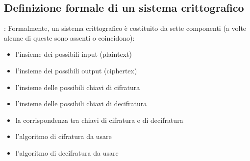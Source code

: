 \subsection{Definizione formale di un sistema crittografico}: Formalmente, un sistema crittografico è costituito da sette componenti (a volte alcune di queste sono assenti o coincidono):
\begin{itemize} 
  \item l'insieme dei possibili input (plaintext)
  \item l'insieme dei possibili output (ciphertex)
  \item l'insieme delle possibili chiavi di cifratura
  \item l'insieme delle possibili chiavi di decifratura
  \item la corrispondenza tra chiavi di cifratura e di decifratura
  \item l'algoritmo di cifratura da usare
  \item l'algoritmo di decifratura da usare
\end{itemize}

